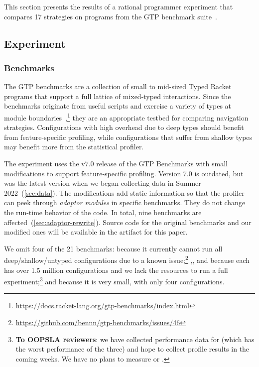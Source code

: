 \newcommand{\numgtp}{16}
\newcommand{\gtpurl}{\url{https://docs.racket-lang.org/gtp-benchmarks/index.html}}
\newcommand{\boundaryMB}{536} %
\newcommand{\statisticalMB}{4645} %
\newcommand{\runtimeMB}{44}

This section presents the results of a rational programmer
experiment that compares 17 strategies on programs from
the GTP benchmark suite~\cite{gtp-benchmarks}.


\subsection{Experiment}

\subsubsection{Benchmarks}

The GTP benchmarks are a collection of small to mid-sized Typed Racket programs
that support a full lattice of mixed-typed interactions.
Since the benchmarks originate from useful scripts
and exercise a variety of types at module boundaries~\cite{gtnffvf-jfp-2019},\footnote{\gtpurl{}}
they are an appropriate testbed for comparing navigation strategies.
Configurations with high overhead due to deep types should benefit from
feature-specific profiling, while configurations that suffer from shallow
types may benefit more from the statistical profiler.

The experiment uses the v7.0 release of the GTP Benchmarks with small modifications
to support feature-specific profiling.
Version 7.0 is outdated, but was the latest version when we began collecting
data in Summer 2022~(\cref{sec:data}).
The modifications add static information so that the profiler can peek through
\emph{adaptor modules} in specific benchmarks.
They do not change the run-time behavior of the code.
In total, nine benchmarks are affected~(\cref{sec:adaptor-rewrite}).
Source code for the original benchmarks and our modified ones will be available
in the artifact for this paper.

We omit four of the 21 benchmarks:
 because it currently cannot run all deep/shallow/untyped configurations
due to a known issue;\footnote{\url{https://github.com/bennn/gtp-benchmarks/issues/46}}
,, and  because each has over 1.5
million configurations and we lack the resources to run a full experiment;\footnote{
\textbf{To OOPSLA reviewers}: we have collected performance data for
 (which has the worst performance of the three) and hope to
collect profile results in the coming weeks.  We have no plans to measure
 or .
}
and  because it is very small, with only four configurations.


